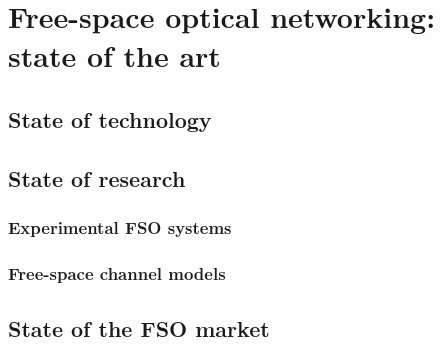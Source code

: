 \chapter{Free-space optical networking: state of the art}
\label{chapterlabel2}

\section{State of technology}
\section{State of research}
\subsection{Experimental FSO systems}
\subsection{Free-space channel models}
\section{State of the FSO market}

\blindtext
